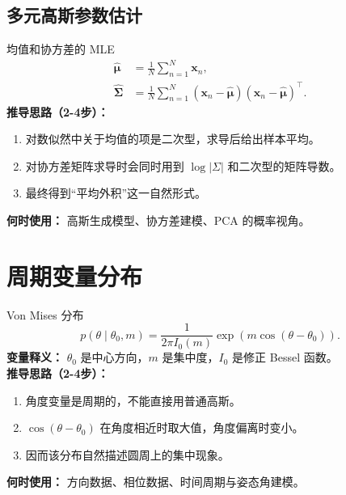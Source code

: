 \documentclass[11pt]{article}
\begin{document}
\subsection{多元高斯参数估计}
\begin{formulabox}{均值和协方差的 MLE}
\begin{align}
\hat{\boldsymbol{\mu}} &= \frac{1}{N}\sum_{n=1}^{N}\mathbf{x}_n,\\
\hat{\mathbf{\Sigma}}
&=\frac{1}{N}\sum_{n=1}^{N}
(\mathbf{x}_n-\hat{\boldsymbol{\mu}})
(\mathbf{x}_n-\hat{\boldsymbol{\mu}})^\top.
\end{align}
\textbf{推导思路（2-4步）：}
\begin{enumerate}[leftmargin=1.6em]
  \item 对数似然中关于均值的项是二次型，求导后给出样本平均。
  \item 对协方差矩阵求导时会同时用到 $\log|\Sigma|$ 和二次型的矩阵导数。
  \item 最终得到“平均外积”这一自然形式。
\end{enumerate}
\textbf{何时使用：} 高斯生成模型、协方差建模、PCA 的概率视角。
\end{formulabox}

\section{周期变量分布}
\begin{formulabox}{Von Mises 分布}
\begin{equation}
p(\theta\mid \theta_0,m)=\frac{1}{2\pi I_0(m)}
\exp\left(m\cos(\theta-\theta_0)\right).
\end{equation}
\textbf{变量释义：} $\theta_0$ 是中心方向，$m$ 是集中度，$I_0$ 是修正 Bessel 函数。\\
\textbf{推导思路（2-4步）：}
\begin{enumerate}[leftmargin=1.6em]
  \item 角度变量是周期的，不能直接用普通高斯。
  \item $\cos(\theta-\theta_0)$ 在角度相近时取大值，角度偏离时变小。
  \item 因而该分布自然描述圆周上的集中现象。
\end{enumerate}
\textbf{何时使用：} 方向数据、相位数据、时间周期与姿态角建模。
\end{formulabox}
\end{document}
